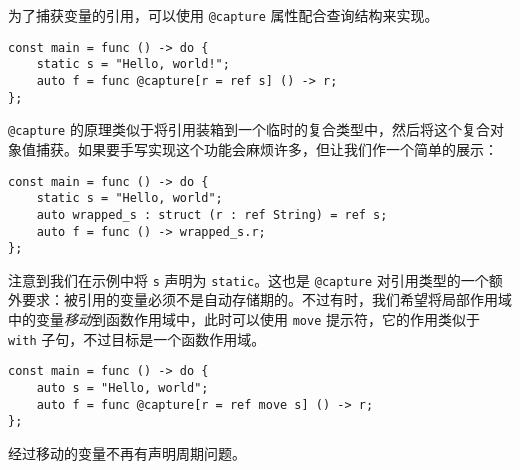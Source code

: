 为了捕获变量的引用，可以使用 \lstinline!@capture! 属性配合查询结构来实现。

\begin{lstlisting}
const main = func () -> do {
	static s = "Hello, world!";
	auto f = func @capture[r = ref s] () -> r;
};
\end{lstlisting}

\lstinline!@capture! 的原理类似于将引用装箱到一个临时的复合类型中，然后将这个复合对象值捕获。如果要手写实现这个功能会麻烦许多，但让我们作一个简单的展示：

\begin{lstlisting}
const main = func () -> do {
	static s = "Hello, world";
	auto wrapped_s : struct (r : ref String) = ref s;
	auto f = func () -> wrapped_s.r;
};
\end{lstlisting}

注意到我们在示例中将 \lstinline!s! 声明为 \lstinline!static!。这也是 \lstinline!@capture! 对引用类型的一个额外要求：被引用的变量必须不是自动存储期的。不过有时，我们希望将局部作用域中的变量\emph{移动}到函数作用域中，此时可以使用 \lstinline!move! 提示符，它的作用类似于 \lstinline!with! 子句，不过目标是一个函数作用域。

\begin{lstlisting}
const main = func () -> do {
	auto s = "Hello, world";
	auto f = func @capture[r = ref move s] () -> r;
};
\end{lstlisting}

经过移动的变量不再有声明周期问题。


